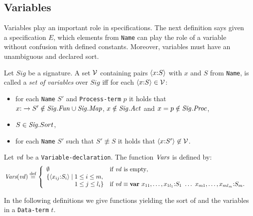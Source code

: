 \documentclass[fleqn,a4paper]{article}
\newcommand{\Sig}{\nm{Sig}}
\newcommand{\Fun}{\nm{Fun}}
\newcommand{\wor}{\stackrel{\mathrm{def}}{=}}
\newcommand{\NV}{{\cal V}}
\newcommand{\Vars}{\mbox{\em Vars}}
\begin{document}
\subsection{Variables}
Variables play an important role in specifications. The next definition
says given a specification $E$, which elements from {\tt Name} can play the
role of a variable without confusion with
defined constants. Moreover, variables must have an unambiguous and
declared sort.
\begin{defn}
Let $Sig$ be a signature. A set $\NV$ containing
pairs
$\langle x{:} S\rangle$ with $x$ and $S$ from {\tt Name},
is called a {\it set of variables} over $Sig$ iff for each $\langle
x\ap S\rangle\in \NV$:
\begin{itemize}
\item
for each {\tt Name} $S'$ and {\tt Process-term} $p$ it holds that
$x\ap \rightarrow S'\notin \Sig.\Fun\cup\Sig.\Map$,
$x\notin\Sig.\Act$ and $x=p\notin\Sig.\Proc$,
\item
$S\in \Sig.Sort$,
\item
for each {\tt Name} $S'$ such that $S'\not\equiv S$ it holds
that $\langle x\ap S'\rangle\not\in \NV$.
\end{itemize}
\end{defn}
\begin{defn}
\newcommand{\vd}{{\it vd}}
Let $\vd$ be a {\tt Variable-declaration}.
The function $\Vars$ is defined by:
\[\Vars(\vd)\wor\left\{
\begin{array}{ll}
\emptyset&\mbox{if $\vd$ is empty},\\
\{\langle x_{ij}\ap S_i\rangle\mid 1\leq i\leq m,\\
\phantom{\{\langle x_i\ap S_{ij}\rangle\mid }\hspace*{1mm}1\leq j\leq
l_i\}&
\mbox{if}~\vd\equiv
\varkw~x_{11},\ldots,x_{1l_1}\ap  S_1~\ldots~x_{m1},\ldots,x_{ml_m}\ap S_m.
\end{array}\right.\]
\end{defn}
In the following definitions we give functions yielding the sort of and the
variables in a
{\tt Data-term} $t$.
\end{document}
